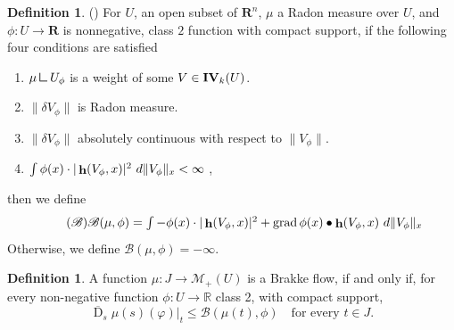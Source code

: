 \documentclass{article}
\theoremstyle{plain}
\theoremstyle{definition}
\newtheorem{definition}[theorem]{Definition}
\theoremstyle{plain}
\theoremstyle{remark}
\theoremstyle{remark}
\theoremstyle{plain}
\newcommand{\weight}{\mathbin{\vrule height 1.6ex depth 0pt width
		0.14ex\vrule height 0.14ex depth 0pt width 1.3ex}}
\DeclareMathOperator{\IVar}{{\bf IV}}
\DeclareMathOperator{\D}{D}
\DeclareMathOperator{\bfh}{{\bf h}}
\DeclareMathOperator{\grad}{grad}
\begin{document}
\begin{definition}\label{Ilmanen-def}
(\cite[6.3]{Ilmanen-EllipticRegularization})
For $U$, an open subset of $\mathbf R^n$, $\mu$ a Radon measure over $U$, and $\phi : U \to \mathbf R$ is nonnegative, class $2$ function with compact support, if the following four conditions are satisfied 
    \begin{enumerate}[label=B-\arabic{enumi}]
        \item \label{integral}
         $\mu \weight U_\phi$ is a weight of some $V\in \IVar_k(U)$.
        \item \label{locally Radon}
        $\|\delta V_\phi\|$ is Radon measure.
        \item 
        \label{locally absolutely continuous}
     $\|\delta V_\phi\|$ absolutely continuous with respect to $\|V_\phi\|$.
        \item 
        \label{weighted L2 mean curvature} 
        $\int \phi(x)\cdot |\bfh(V_\phi,x)|^2 \ d \|V_\phi\|_x<\infty$ ,
    \end{enumerate}
    then we define 
    \begin{equation}
        \label{regular case}\tag{{$\mathscr B$}}
        \textstyle \mathscr B(\mu,\phi)  = \int -\phi (x)\cdot |\bfh(V_\phi,x)|^2 +\grad \phi(x)\bullet \bfh(V_\phi,x)\ d \|V_\phi\|_x
    \end{equation} 
      Otherwise, we define
    $\mathscr B(\mu,\phi)=-\infty$.
\end{definition}

\begin{definition}\label{def: Ilmanen def Brakke flow}
    A function $\mu \colon J \rightarrow \mathscr{M}_{+} (U)$ is a Brakke flow, if and only if, for every non-negative function $\phi \colon U \rightarrow \mathbb{R}$ class 2, with compact support, 
    \begin{equation*}
        \overline{\D}_{s} \mu (s) (\varphi)|_{t} \leq \mathscr{B} (\mu (t), \phi) \quad \text{for every $t\in J$}.
    \end{equation*}
\end{definition}
\end{document}
